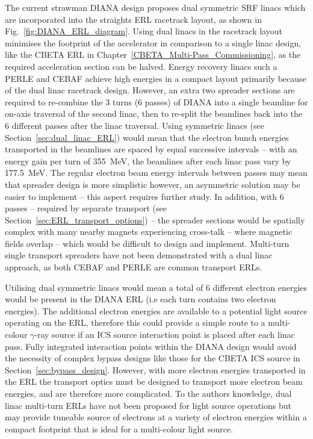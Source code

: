 \documentclass[../main.tex]{subfiles}
\begin{document}
The current strawman DIANA design proposes dual symmetric SRF linacs which are incorporated into the straights ERL racetrack layout, as shown in Fig.~\ref{fig:DIANA_ERL_diagram}. Using dual linacs in the racetrack layout minimises the footprint of the accelerator in comparison to a single linac design, like the CBETA ERL in Chapter~\ref{CBETA_Multi-Pass_Commissioning}, as the required acceleration section can be halved. Energy recovery linacs such a PERLE \cite{angal2018perle} and CEBAF \cite{meot2016er} achieve high energies in a compact layout primarily because of the dual linac racetrack design. However, an extra two spreader sections are required to re-combine the 3 turns (6 passes) of DIANA into a single beamline for on-axis traversal of the second linac, then to re-split the beamlines back into the 6 different passes after the linac traversal. Using symmetric linacs (see Section~\ref{sec:dual_linac_ERL}) would mean that the electron bunch energies transported in the beamlines are spaced by equal successive intervals -- with an energy gain per turn of 355~\si{\mega\electronvolt}, the beamlines after each linac pass vary by 177.5~\si{\mega\electronvolt}. The regular electron beam energy intervals between passes may mean that spreader design is more simplistic however, an asymmetric solution may be easier to implement -- this aspect requires further study. In addition, with 6 passes -- required by separate transport (see Section~\ref{sec:ERL_transport_options}) -- the spreader sections would be spatially complex with many nearby magnets experiencing cross-talk -- where magnetic fields overlap -- which would be difficult to design and implement. Multi-turn single transport spreaders have not been demonstrated with a dual linac approach, as both CEBAF \cite{meot2016er} and PERLE \cite{angal2018perle} are common transport ERLs. 

Utilising dual symmetric linacs would mean a total of 6 different electron energies would be present in the DIANA ERL (i.e each turn contains two electron energies). The additional electron energies are available to a potential light source operating on the ERL, therefore this could provide a simple route to a multi-colour $\gamma$-ray source if an ICS source interaction point is placed after each linac pass. Fully integrated interaction points within the DIANA design would avoid the necessity of complex bypass designs like those for the CBETA ICS source in Section~\ref{sec:bypass_design}. However, with more electron energies transported in the ERL the transport optics must be designed to transport more electron beam energies, and are therefore more complicated. To the authors knowledge, dual linac multi-turn ERLs have not been proposed for light source operations but may provide tuneable source of electrons at a variety of electron energies within a compact footprint that is ideal for a multi-colour light source.
\end{document}
